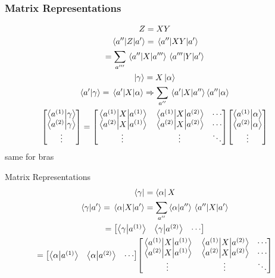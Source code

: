 \begin{frame}
	\frametitle{Matrix Representations}

	\begin{gather*}
		Z = XY\\
		\mel{a''}{Z}{a'} = \mel{a''}{XY}{a'} \\
		= \sum_{a'''} \mel{a''}{X}{a'''} \mel{a'''}{Y}{a'}\\
		\ket{\gamma} = X \ket{\alpha}\\
		\ip{a'}{\gamma} = \mel{a'}{X}{\alpha} \Rightarrow \sum_{a''} \mel{a'}{X}{a''}\ip{a''}{\alpha} \\
		\mqty[\ip{a^{(1)}}{\gamma} \\ \ip{a^{(2)}}{\gamma} \\ \vdots] = \mqty[
			\ev{X}{a^{(1)}} & \mel{a^{(1)}}{X}{a^{(2)}} & \cdots \\
			\mel{a^{(2)}}{X}{a^{(1)}} & \ev{X}{a^{(2)}} & \cdots \\
			\vdots & \vdots & \ddots
		] \mqty[\ip{a^{(1)}}{\alpha} \\ \ip{a^{(2)}}{\alpha} \\ \vdots]
	\end{gather*}
	same for bras
\end{frame}

\begin{frame}{Matrix Representations}
	\begin{gather*}
		\bra{\gamma} = \bra{\alpha} X \\
		\ip{\gamma}{a'} = \mel{\alpha}{X}{a'} = \sum_{a''} \ip{\alpha}{a''}\mel{a'' }{X}{a'}\\
		= \mqty[\ip{\gamma}{a^{(1)}} & \ip{\gamma}{a^{(2)}} & \cdots]  \\
		= \mqty[\ip{\alpha}{a^{(1)}} & \ip{\alpha}{a^{(2)}} & \cdots]
		\mqty[
			\ev{X}{a^{(1)}} & \mel{a^{(1)}}{X}{a^{(2)}} & \cdots \\
			\mel{a^{(2)}}{X}{a^{(1)}} & \ev{X}{a^{(2)}} & \cdots \\
			\vdots & \vdots & \ddots
		]
	\end{gather*}

\end{frame}

